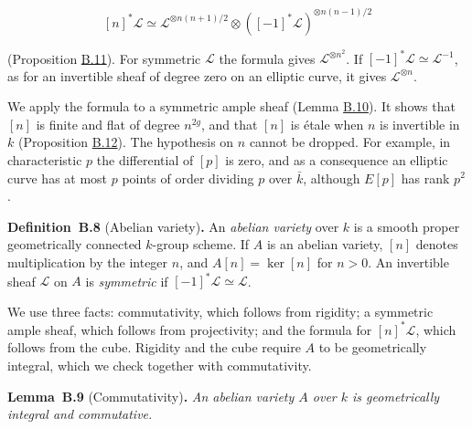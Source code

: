 \documentclass[11pt]{article}
\newenvironment{bpstatement}[2]{\par\addvspace{0.6\baselineskip}\noindent\textbf{#1}#2\textbf{.}\enspace\ignorespaces}
  {\par\addvspace{0.4\baselineskip}}
\newenvironment{bpstatementit}[2]{\begin{bpstatement}{#1}{#2}\itshape\ignorespaces}{\end{bpstatement}}
\begin{document}
\[
[n]^*\mathcal L\simeq\mathcal L^{\otimes n(n+1)/2}\otimes([-1]^*\mathcal L)^{\otimes n(n-1)/2}
\]

(Proposition \hyperref[bp105]{B.11}). For symmetric \(\mathcal L\) the formula gives \(\mathcal L^{\otimes n^2}\). If \([-1]^*\mathcal L\simeq\mathcal L^{-1}\), as for an invertible sheaf of degree zero on an elliptic curve, it gives \(\mathcal L^{\otimes n}\).

We apply the formula to a symmetric ample sheaf (Lemma \hyperref[bp103]{B.10}). It shows that \([n]\) is finite and flat of degree \(n^{2g}\), and that \([n]\) is étale when \(n\) is invertible in \(k\) (Proposition \hyperref[bp108]{B.12}). The hypothesis on \(n\) cannot be dropped. For example, in characteristic \(p\) the differential of \([p]\) is zero, and as a consequence an elliptic curve has at most \(p\) points of order dividing \(p\) over \(\bar k\), although \(E[p]\) has rank \(p^2\).

\label{bp98}%
\begin{bpstatement}{Definition~B.8}{ (Abelian variety)}
An \emph{abelian variety} over \(k\) is a smooth proper geometrically connected \(k\)-group scheme. If \(A\) is an abelian variety, \([n]\) denotes multiplication by the integer \(n\), and \(A[n]=\ker[n]\) for \(n>0\). An invertible sheaf \(\mathcal L\) on \(A\) is \emph{symmetric} if \([-1]^*\mathcal L\simeq\mathcal L\).
\end{bpstatement}

\label{bp99}%
We use three facts: commutativity, which follows from rigidity; a symmetric ample sheaf, which follows from projectivity; and the formula for \([n]^*\mathcal L\), which follows from the cube. Rigidity and the cube require \(A\) to be geometrically integral, which we check together with commutativity.

\label{bp100}%
\begin{bpstatementit}{Lemma~B.9}{ (Commutativity)}
An abelian variety \(A\) over \(k\) is geometrically integral and commutative.
\end{bpstatementit}
\end{document}
